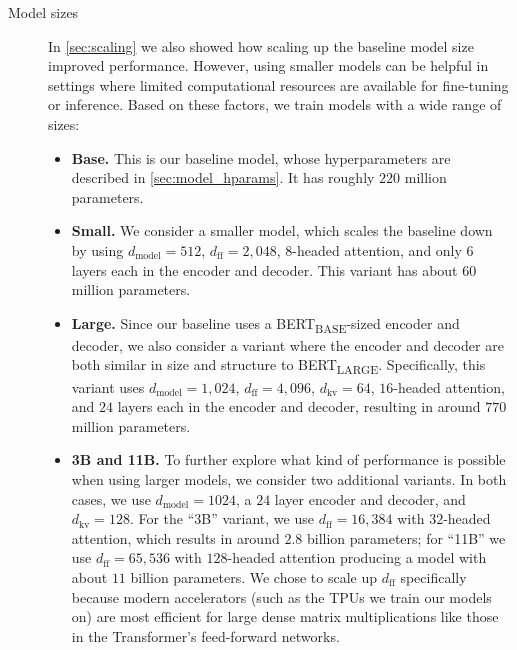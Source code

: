 \begin{description}
\item[Model sizes] In \ref{sec:scaling} we also showed how scaling up the baseline model size improved performance. However, using smaller models can be helpful in settings where limited computational resources are available for fine-tuning or inference. Based on these factors, we train models with a wide range of sizes:
\begin{itemize}
  \item \textbf{Base.} This is our baseline model, whose hyperparameters are described in \ref{sec:model_hparams}. It has roughly $220$ million parameters.
  \item \textbf{Small.} We consider a smaller model, which scales the baseline down by using $d_{\mathrm{model}} = 512$, $d_{\mathrm{ff}} = 2{,}048$, $8$-headed attention, and only $6$ layers each in the encoder and decoder. This variant has about $60$ million parameters.
  \item \textbf{Large.} Since our baseline uses a BERT\textsubscript{BASE}-sized encoder and decoder, we also consider a variant where the encoder and decoder are both similar in size and structure to BERT\textsubscript{LARGE}. Specifically, this variant uses $d_{\mathrm{model}} = 1{,}024$, $d_{\mathrm{ff}} = 4{,}096$, $d_{\mathrm{kv}} = 64$, $16$-headed attention, and $24$ layers each in the encoder and decoder, resulting in around $770$ million parameters.
  \item \textbf{3B and 11B.} To further explore what kind of performance is possible when using larger models, we consider two additional variants. In both cases, we use $d_{\mathrm{model}} = 1024$, a $24$ layer encoder and decoder, and $d_{\mathrm{kv}} = 128$. For the ``3B'' variant, we use $d_{\mathrm{ff}} = 16{,}384$ with $32$-headed attention, which results in around $2.8$ billion parameters; for ``11B'' we use $d_{\mathrm{ff}} = 65{,}536$ with $128$-headed attention producing a model with about $11$ billion parameters. We chose to scale up $d_{\mathrm{ff}}$ specifically because modern accelerators (such as the TPUs we train our models on) are most efficient for large dense matrix multiplications like those in the Transformer's feed-forward networks.
\end{itemize}


\end{description}
